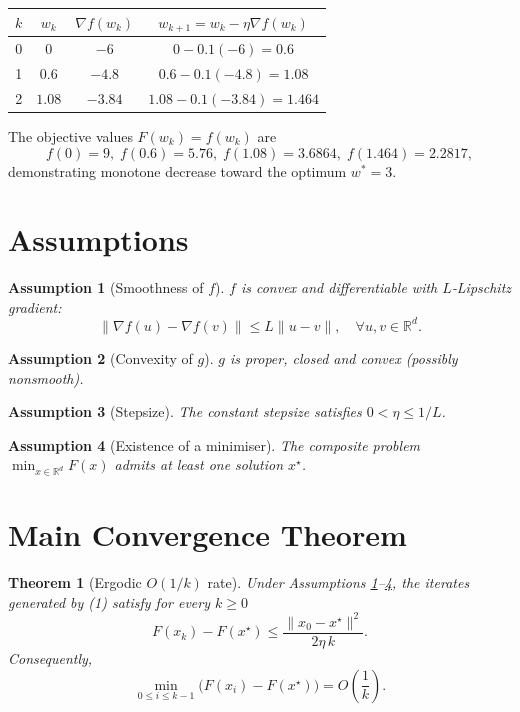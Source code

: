 \documentclass{article}
\newtheorem{theorem}{Theorem}
\newtheorem{assumption}{Assumption}
\newcommand{\R}{\mathbb{R}}
\begin{document}
\begin{center}
\begin{tabular}{c|c|c|c}
$k$ & $w_{k}$ & $\nabla f(w_{k})$ & $w_{k+1}=w_{k}-\eta\nabla f(w_{k})$\\ \hline
0 & $0$ & $-6$ & $0-0.1(-6)=0.6$\\
1 & $0.6$ & $-4.8$ & $0.6-0.1(-4.8)=1.08$\\
2 & $1.08$ & $-3.84$ & $1.08-0.1(-3.84)=1.464$\\
\end{tabular}
\end{center}
The objective values $F(w_{k})=f(w_{k})$ are
\[
f(0)=9,\; f(0.6)=5.76,\; f(1.08)=3.6864,\; f(1.464)=2.2817,
\]
demonstrating monotone decrease toward the optimum $w^{*}=3$.

\newpage

\section*{Assumptions}
\begin{assumption}[Smoothness of $f$]\label{as:lip}
$f$ is convex and differentiable with $L$‑Lipschitz gradient:
\[
\|\nabla f(u)-\nabla f(v)\|\le L\|u-v\|,\quad\forall u,v\in\R^{d}.
\]
\end{assumption}
\begin{assumption}[Convexity of $g$]\label{as:convex}
$g$ is proper, closed and convex (possibly nonsmooth).
\end{assumption}
\begin{assumption}[Stepsize]\label{as:stepsize}
The constant stepsize satisfies $0<\eta\le 1/L$.
\end{assumption}
\begin{assumption}[Existence of a minimiser]\label{as:opt}
The composite problem $\min_{x\in\R^{d}}F(x)$ admits at least one solution $x^{\star}$.
\end{assumption}

\section*{Main Convergence Theorem}
\begin{theorem}[Ergodic $O(1/k)$ rate]\label{thm:rate}
Under Assumptions \ref{as:lip}–\ref{as:opt}, the iterates generated by (1) satisfy for every $k\ge0$
\[
F(x_{k})-F(x^{\star})\le \frac{\|x_{0}-x^{\star}\|^{2}}{2\eta\,k}.
\]
Consequently,
\[
\min_{0\le i\le k-1}\bigl(F(x_{i})-F(x^{\star})\bigr)=O\!\left(\frac{1}{k}\right).
\]
\end{theorem}
\end{document}
